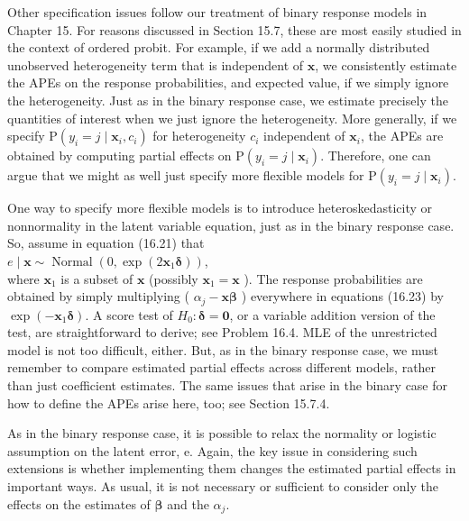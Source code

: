 \documentclass[10pt]{article}
\begin{document}
Other specification issues follow our treatment of binary response models in Chapter 15. For reasons discussed in Section 15.7, these are most easily studied in the context of ordered probit. For example, if we add a normally distributed unobserved heterogeneity term that is independent of $\mathbf{x}$, we consistently estimate the APEs on the response probabilities, and expected value, if we simply ignore the heterogeneity. Just as in the binary response case, we estimate precisely the quantities of interest when we just ignore the heterogeneity. More generally, if we specify $\mathrm{P}\left(y_{i}=j \mid \mathbf{x}_{i}, c_{i}\right)$ for heterogeneity $c_{i}$ independent of $\mathbf{x}_{i}$, the APEs are obtained by computing partial effects on $\mathrm{P}\left(y_{i}=j \mid \mathbf{x}_{i}\right)$. Therefore, one can argue that we might as well just specify more flexible models for $\mathrm{P}\left(y_{i}=j \mid \mathbf{x}_{i}\right)$.

One way to specify more flexible models is to introduce heteroskedasticity or nonnormality in the latent variable equation, just as in the binary response case. So, assume in equation (16.21) that\\
$e \mid \mathbf{x} \sim \operatorname{Normal}\left(0, \exp \left(2 \mathbf{x}_{1} \boldsymbol{\delta}\right)\right)$,\\
where $\mathbf{x}_{1}$ is a subset of $\mathbf{x}$ (possibly $\mathbf{x}_{1}=\mathbf{x}$ ). The response probabilities are obtained by simply multiplying ( $\alpha_{j}-\mathbf{x} \boldsymbol{\beta}$ ) everywhere in equations (16.23) by $\exp \left(-\mathbf{x}_{1} \boldsymbol{\delta}\right)$. A score test of $H_{0}: \boldsymbol{\delta}=\mathbf{0}$, or a variable addition version of the test, are straightforward to derive; see Problem 16.4. MLE of the unrestricted model is not too difficult, either. But, as in the binary response case, we must remember to compare estimated partial effects across different models, rather than just coefficient estimates. The same issues that arise in the binary case for how to define the APEs arise here, too; see Section 15.7.4.

As in the binary response case, it is possible to relax the normality or logistic assumption on the latent error, e. Again, the key issue in considering such extensions is whether implementing them changes the estimated partial effects in important ways. As usual, it is not necessary or sufficient to consider only the effects on the estimates of $\boldsymbol{\beta}$ and the $\alpha_{j}$.
\end{document}
